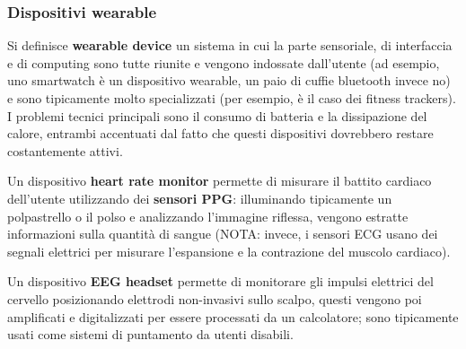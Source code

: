 \subsubsection*{Dispositivi wearable}
Si definisce \textbf{wearable device} un sistema in cui la parte sensoriale, di interfaccia e di computing sono tutte riunite e vengono indossate
dall'utente (ad esempio, uno smartwatch è un dispositivo wearable, un paio di cuffie bluetooth invece no) e sono tipicamente molto specializzati
(per esempio, è il caso dei fitness trackers). I problemi tecnici principali sono il consumo di batteria e la dissipazione del calore, entrambi accentuati
dal fatto che questi dispositivi dovrebbero restare costantemente attivi.

Un dispositivo \textbf{heart rate monitor} permette di misurare il battito cardiaco dell'utente utilizzando dei \textbf{sensori PPG}: illuminando
tipicamente un polpastrello o il polso e analizzando l'immagine riflessa, vengono estratte informazioni sulla quantità di sangue
(NOTA: invece, i sensori ECG usano dei segnali elettrici per misurare l'espansione e la contrazione del muscolo cardiaco).

Un dispositivo \textbf{EEG headset} permette di monitorare gli impulsi elettrici del cervello posizionando elettrodi non-invasivi sullo scalpo, questi
vengono poi amplificati e digitalizzati per essere processati da un calcolatore; sono tipicamente usati come sistemi di puntamento da utenti disabili.